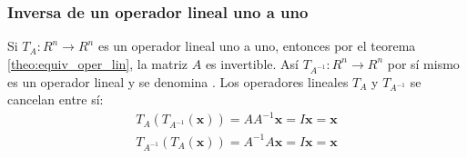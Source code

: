 \documentclass[a4paper,12pt]{article}
\begin{document}
\subsubsection{Inversa de un operador lineal uno a uno}

Si $T_A:R^n\rightarrow R^n$ es un operador lineal uno a uno, entonces por el
teorema \ref{theo:equiv_oper_lin}, la matriz $A$ es invertible. Así
$T_{A^{-1}}:R^n\rightarrow R^n$ por sí mismo es un operador lineal y se
denomina . Los operadores lineales $T_A$ y $T_{A^{-1}}$
se cancelan entre sí:
\begin{align*}
  T_A(T_{A^{-1}}(\mathbf{x}))=AA^{-1}\mathbf{x}=I\mathbf{x}=\mathbf{x} \\
  T_{A^{-1}}(T_A(\mathbf{x}))=A^{-1}A\mathbf{x}=I\mathbf{x}=\mathbf{x}
\end{align*}
\end{document}
